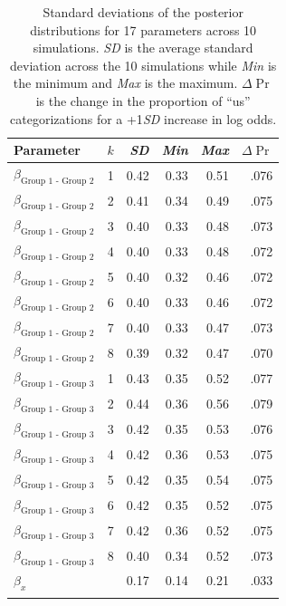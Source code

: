 \documentclass[12pt, a4paper]{article}
\begin{document}
\begin{table}[!p]
\centering
{}
\caption{Standard deviations of the posterior distributions for 17 parameters across 10 simulations. \textit{SD} is the average standard deviation across the 10 simulations while \textit{Min} is the minimum and \textit{Max} is the maximum. $\Delta\Pr$ is the change in the proportion of ``us'' categorizations for a +1\textit{SD} increase in log odds.}
\small	
\begin{tabular}{lrrrrr} \toprule
Parameter & $k$ & \textit{SD} & \textit{Min} & \textit{Max} & $\Delta\Pr$ \\
\midrule \addlinespace
  $\beta_\text{Group 1 - Group 2}$ & 1 & 0.42 & 0.33 & 0.51 & .076 \\
  $\beta_\text{Group 1 - Group 2}$ & 2 & 0.41 & 0.34 & 0.49 & .075 \\
  $\beta_\text{Group 1 - Group 2}$ & 3 & 0.40 & 0.33 & 0.48 & .073 \\
  $\beta_\text{Group 1 - Group 2}$ & 4 & 0.40 & 0.33 & 0.48 & .072 \\
  $\beta_\text{Group 1 - Group 2}$ & 5 & 0.40 & 0.32 & 0.46 & .072 \\
  $\beta_\text{Group 1 - Group 2}$ & 6 & 0.40 & 0.33 & 0.46 & .072 \\
  $\beta_\text{Group 1 - Group 2}$ & 7 & 0.40 & 0.33 & 0.47 & .073 \\
  $\beta_\text{Group 1 - Group 2}$ & 8 & 0.39 & 0.32 & 0.47 & .070 \\
  $\beta_\text{Group 1 - Group 3}$ & 1 & 0.43 & 0.35 & 0.52 & .077 \\
  $\beta_\text{Group 1 - Group 3}$ & 2 & 0.44 & 0.36 & 0.56 & .079 \\
  $\beta_\text{Group 1 - Group 3}$ & 3 & 0.42 & 0.35 & 0.53 & .076 \\
  $\beta_\text{Group 1 - Group 3}$ & 4 & 0.42 & 0.36 & 0.53 & .075 \\
  $\beta_\text{Group 1 - Group 3}$ & 5 & 0.42 & 0.35 & 0.54 & .075 \\
  $\beta_\text{Group 1 - Group 3}$ & 6 & 0.42 & 0.35 & 0.52 & .075 \\
  $\beta_\text{Group 1 - Group 3}$ & 7 & 0.42 & 0.36 & 0.52 & .075 \\
  $\beta_\text{Group 1 - Group 3}$ & 8 & 0.40 & 0.34 & 0.52 & .073 \\
	$\beta_x$                        &   & 0.17 & 0.14 & 0.21 & .033 \\
\addlinespace 
\bottomrule
\end{tabular}
\label{tab:b-1}
\end{table}
\end{document}

